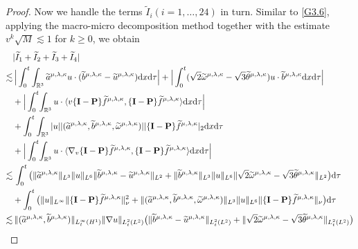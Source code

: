 \documentclass[reqno,11pt]{amsart}
\theoremstyle{plain}
\numberwithin{equation}{section}
\begin{document}
\begin{proof}
Now we handle the terms $\widetilde{I}_i (i=1,\dots, 24)$ in turn. 
Similar to \eqref{G3.6}, applying the macro-micro decomposition method together with the estimate $v^{k}\sqrt{M} \lesssim 1$ for $k \geq 0$, we obtain   
\begin{align}\label{G4.9}
&|\widetilde{I}_1+\widetilde{I}_2+\widetilde{I}_3+\widetilde{I}_4|\nonumber\\
\lesssim&\, \Big|\int_0^t
\int_{\mathbb{R}^3}\widetilde{a}^{\mu,\lambda,\kappa} u\cdot(\widetilde{b}^{\mu,\lambda,\kappa}-\widetilde{u}^{\mu,\lambda,\kappa}){\rm d}x{\rm d}\tau\Big|+ \Big|\int_0^t(\sqrt{2}\widetilde{\omega}^{\mu,\lambda,\kappa}-\sqrt{3}\widetilde{\theta}^{\mu,\lambda,\kappa})u\cdot\widetilde{b}^{\mu,\lambda,\kappa}{\rm d}x{\rm d}\tau\Big|\nonumber\\
&+ \Big|\int_0^t\!\int_{\mathbb{R}^3}u\cdot\langle v\{\mathbf{I}-\mathbf{P}\}\widetilde{f}^{\mu,\lambda,\kappa}, \{\mathbf{I}-\mathbf{P}\}\widetilde{f}^{\mu,\lambda,\kappa}\rangle{\rm d}x{\rm d}\tau \Big|\nonumber\\
&+\int_0^t \int_{\mathbb{R}^3}|u||(\widetilde{a}^{\mu,\lambda,\kappa},\widetilde{b}^{\mu,\lambda,\kappa},\widetilde{\omega}^{\mu,\lambda,\kappa})||\{\mathbf{I}-\mathbf{P}\}\widetilde{f}^{\mu,\lambda,\kappa}|_2{\rm d}x{\rm d}\tau\nonumber\\
&+\Big|\int_0^t\!\int_{\mathbb{R}^3}u\cdot\langle \nabla_v\{\mathbf{I}-\mathbf{P}\}\widetilde{f}^{\mu,\lambda,\kappa},\{\mathbf{I}-\mathbf{P}\}\widetilde{f}^{\mu,\lambda,\kappa}\rangle{\rm d}x{\rm d}\tau\Big|\nonumber\\
\lesssim&\, \int_0^t\big(\|\widetilde{a}^{\mu,\lambda,\kappa}\|_{L^3}\|u\|_{L^6}\|\widetilde{b}^{\mu,\lambda,\kappa}-\widetilde{u}^{\mu,\lambda,\kappa}\|_{L^2}+\|\widetilde{b}^{\mu,\lambda,\kappa}\|_{L^3}\|u\|_{L^6}\|\sqrt{2}\widetilde\omega^{\mu,\lambda,\kappa}-\sqrt{3}\widetilde\theta^{\mu,\lambda,\kappa}\|_{L^2}\big){\rm d}\tau\nonumber\\
 &+\int_0^t\big(\|u\|_{L^{\infty}} \|\{\mathbf{I}-\mathbf{P}\}\widetilde{f}^{\mu,\lambda,\kappa}\|_{\nu}^{2}+\|(\widetilde{a}^{\mu,\lambda,\kappa},\widetilde{b}^{\mu,\lambda,\kappa},\widetilde\omega^{\mu,\lambda,\kappa})\|_{L^3}\|u\|_{L^6} \|\{\mathbf{I}-\mathbf{P}\}\widetilde{f}^{\mu,\lambda,\kappa}\|_{\nu}\big){\rm d}\tau\nonumber\\
 \lesssim&\, \|(\widetilde{a}^{\mu,\lambda,\kappa},\widetilde{b}^{\mu,\lambda,\kappa}
 )\|_{L_t^\infty(H^1)}\|\nabla u\|_{L_t^2(L^2)}\big(\|\widetilde{b}^{\mu,\lambda,\kappa}-\widetilde{u}^{\mu,\lambda,\kappa}\|_{L_t^2(L^2)}+\|\sqrt{2}\widetilde{\omega}^{\mu,\lambda,\kappa}-\sqrt{3}\widetilde{\theta}^{\mu,\lambda,\kappa}\|_{L_t^2(L^2)}   \big) \nonumber\\

\end{align}
\end{proof}
\end{document}
